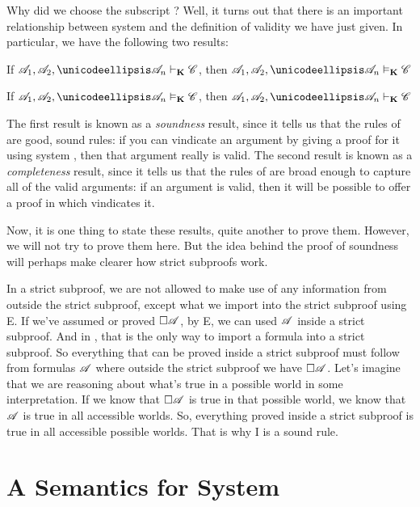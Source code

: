 Why did we choose the subscript \mlK? Well, it turns out that there is an important relationship between system \mlK{} and the definition of validity we have just given. In particular, we have the following two results:
\begin{compactlist}
	\item If $\metav{A}_1,\metav{A}_2, \dots \metav{A}_n\proves_\mlK\metav{C}$, then $\metav{A}_1,\metav{A}_2, \dots \metav{A}_n\entails_\mlK\metav{C}$
	\item If $\metav{A}_1,\metav{A}_2, \dots \metav{A}_n\entails_\mlK\metav{C}$, then $\metav{A}_1,\metav{A}_2, \dots \metav{A}_n\proves_\mlK\metav{C}$
\end{compactlist}
The first result is known as a \emph{soundness} result, since it tells us that the rules of \mlK{} are good, sound rules: if you can vindicate an argument by giving a proof for it using system \mlK, then that argument really is valid. The second result is known as a \emph{completeness} result, since it tells us that the rules of \mlK{} are broad enough to capture all of the valid arguments: if an argument is valid, then it will be possible to offer a proof in \mlK{} which vindicates it.

Now, it is one thing to state these results, quite another to prove them. However, we will not try to prove them here. But the idea behind the proof of soundness will perhaps make clearer how strict subproofs work.

In a strict subproof, we are not allowed to make use of any information from outside the strict subproof, except what we import into the strict subproof using \ebox E. If we've assumed or proved $\Box \mathscr{A}$, by \ebox E, we can used $\mathscr{A}$ inside a strict subproof. And in \mlK, that is the only way to import a formula into a strict subproof. So everything that can be proved inside a strict subproof must follow from formulas $\mathscr{A}$ where outside the strict subproof we have $\Box \mathscr{A}$. Let's imagine that we are reasoning about what's true in a possible world in some interpretation. If we know that $\Box\mathscr{A}$ is true in that possible world, we know that $\mathscr{A}$ is true in all accessible worlds. So, everything proved inside a strict subproof is true in all accessible possible worlds. That is why \ebox I is a sound rule.

\section{A Semantics for System \mlT}
\label{SemanticsT}


